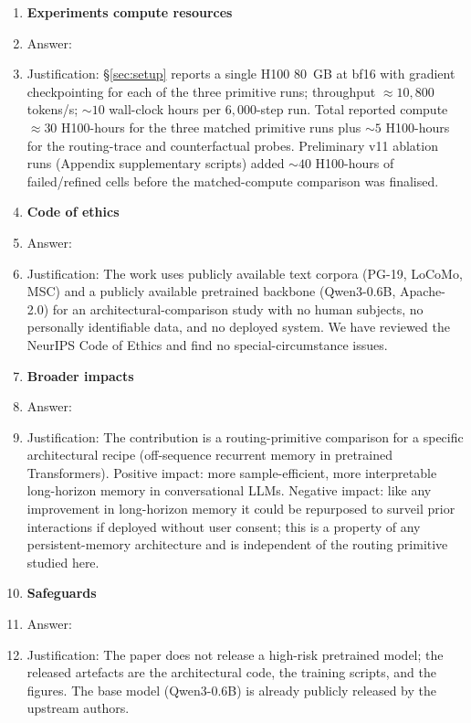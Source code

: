 \begin{enumerate}
\item {\bf Experiments compute resources}
    \item[] Answer: \answerYes{}
    \item[] Justification: \S\ref{sec:setup} reports a single H100 80~GB at bf16 with gradient checkpointing for each of the three primitive runs; throughput ${\approx}10{,}800$ tokens/s; ${\sim}10$ wall-clock hours per $6{,}000$-step run.  Total reported compute ${\approx}30$ H100-hours for the three matched primitive runs plus ${\sim}5$ H100-hours for the routing-trace and counterfactual probes.  Preliminary v11 ablation runs (Appendix supplementary scripts) added ${\sim}40$ H100-hours of failed/refined cells before the matched-compute comparison was finalised.

\item {\bf Code of ethics}
    \item[] Answer: \answerYes{}
    \item[] Justification: The work uses publicly available text corpora (PG-19, LoCoMo, MSC) and a publicly available pretrained backbone (Qwen3-0.6B, Apache-2.0) for an architectural-comparison study with no human subjects, no personally identifiable data, and no deployed system.  We have reviewed the NeurIPS Code of Ethics and find no special-circumstance issues.

\item {\bf Broader impacts}
    \item[] Answer: \answerYes{}
    \item[] Justification: The contribution is a routing-primitive comparison for a specific architectural recipe (off-sequence recurrent memory in pretrained Transformers).  Positive impact: more sample-efficient, more interpretable long-horizon memory in conversational LLMs.  Negative impact: like any improvement in long-horizon memory it could be repurposed to surveil prior interactions if deployed without user consent; this is a property of any persistent-memory architecture and is independent of the routing primitive studied here.

\item {\bf Safeguards}
    \item[] Answer: \answerNA{}
    \item[] Justification: The paper does not release a high-risk pretrained model; the released artefacts are the architectural code, the training scripts, and the figures.  The base model (Qwen3-0.6B) is already publicly released by the upstream authors.


\end{enumerate}
